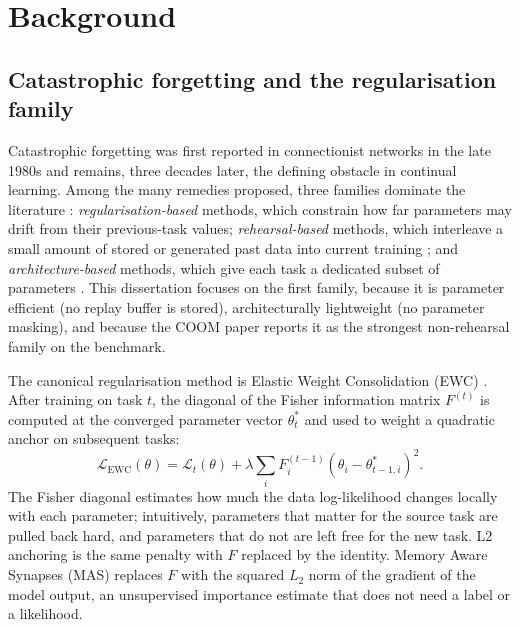 \section{Background}
\label{sec:background}

\subsection{Catastrophic forgetting and the regularisation family}

Catastrophic forgetting was first reported in connectionist networks
in the late 1980s \citep{french1999catastrophic} and remains, three
decades later, the defining obstacle in continual learning. Among the
many remedies proposed, three families dominate the literature
\citep{parisi2019continual}: \emph{regularisation-based} methods,
which constrain how far parameters may drift from their previous-task
values; \emph{rehearsal-based} methods, which interleave a small
amount of stored or generated past data into current training
\citep{chaudhry2019agem, daniels2022clonex}; and
\emph{architecture-based} methods, which give each task a
dedicated subset of parameters \citep{mallya2018packnet}. This
dissertation focuses on the first family, because it is parameter
efficient (no replay buffer is stored), architecturally lightweight
(no parameter masking), and because the COOM paper reports it as the
strongest non-rehearsal family on the benchmark.

The canonical regularisation method is Elastic Weight Consolidation
(EWC) \citep{kirkpatrick2017ewc}. After training on task $t$, the
diagonal of the Fisher information matrix $F^{(t)}$ is computed at
the converged parameter vector $\theta^*_t$ and used to weight a
quadratic anchor on subsequent tasks:
\begin{equation}
    \mathcal{L}_{\text{EWC}}(\theta) =
        \mathcal{L}_t(\theta)
        + \lambda \sum_i F^{(t-1)}_i (\theta_i - \theta^{*}_{t-1, i})^2.
    \label{eq:ewc}
\end{equation}
The Fisher diagonal estimates how much the data log-likelihood
changes locally with each parameter; intuitively, parameters that
matter for the source task are pulled back hard, and parameters that
do not are left free for the new task. L2 anchoring is the same
penalty with $F$ replaced by the identity. Memory Aware Synapses
(MAS) \citep{aljundi2018mas} replaces $F$ with the squared $L_2$ norm
of the gradient of the model output, an unsupervised importance
estimate that does not need a label or a likelihood.

